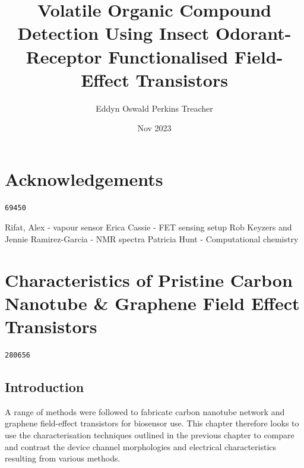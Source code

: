 \documentclass[
  a4paper,
]{scrbook}
\title{Volatile Organic Compound Detection Using Insect Odorant-Receptor
Functionalised Field-Effect Transistors}
\author{Eddyn Oswald Perkins Treacher}
\date{Nov 2023}
\renewcommand*\contentsname{Table of contents}
\newcommand\contentsname{Table of contents}
\begin{document}
\frontmatter
\maketitle
\ifdefined\Shaded\renewenvironment{Shaded}{\begin{tcolorbox}[sharp corners, boxrule=0pt, interior hidden, breakable, borderline west={3pt}{0pt}{shadecolor}, enhanced, frame hidden]}{\end{tcolorbox}}\fi

\renewcommand*\contentsname{Table of contents}
{
\setcounter{tocdepth}{2}
\tableofcontents
}
\mainmatter
{}

\hypertarget{acknowledgements}{%
\chapter*{Acknowledgements}\label{acknowledgements}}


\begin{verbatim}
69450
\end{verbatim}

Rifat, Alex - vapour sensor Erica Cassie - FET sensing setup Rob Keyzers
and Jennie Ramirez-Garcia - NMR spectra Patricia Hunt - Computational
chemistry


\hypertarget{characteristics-of-pristine-carbon-nanotube-graphene-field-effect-transistors}{%
\chapter{Characteristics of Pristine Carbon Nanotube \& Graphene Field
Effect
Transistors}\label{characteristics-of-pristine-carbon-nanotube-graphene-field-effect-transistors}}

\begin{verbatim}
280656
\end{verbatim}

\hypertarget{introduction}{%
\section{Introduction}\label{introduction}}

A range of methods were followed to fabricate carbon nanotube network
and graphene field-effect transistors for biosensor use. This chapter
therefore looks to use the characterisation techniques outlined in the
previous chapter to compare and contrast the device channel morphologies
and electrical characteristics resulting from various methods.
\end{document}
